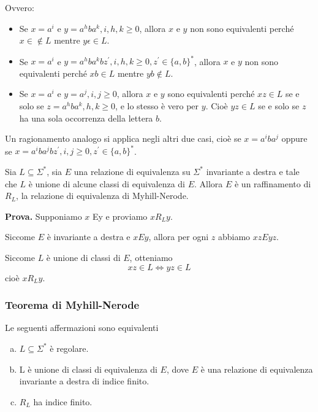 Ovvero:

\begin{itemize}
    \item Se $x=a^{i}$ e $y=a^{h} b a^{k}, i, h, k \geq 0$, allora $x$ e $y$ non sono equivalenti perché $x \in \notin L$ mentre $y \epsilon \in L$.
    \item Se $x=a^{i}$ e $y=a^{h} b a^{k} b z^{\prime}, i, h, k \geq 0, z^{\prime} \in\{a, b\}^{*}$, allora $x$ e $y$ non sono equivalenti perché $x b \in L$ mentre $y b \notin L$.
    \item Se $x=a^{i}$ e $y=a^{j}, i, j \geq 0$, allora $x$ e $y$ sono equivalenti perché $x z \in L$ se e solo se $z=a^{h} b a^{k}, h, k \geq 0$, e lo stesso è vero per $y$. Cioè $y z \in L$ se e solo se $z$ ha una sola occorrenza della lettera $b$.
\end{itemize}

Un ragionamento analogo si applica negli altri due casi, cioè se $x=a^{i} b a^{j}$ oppure se $x=a^{i} b a^{j} b z^{\prime}, i, j \geq 0, z^{\prime} \in\{a, b\}^{*}$.

\vspace{5mm}

Sia $L \subseteq \Sigma^{*}$, sia $E$ una relazione di equivalenza su $\Sigma^{*}$ invariante a destra e tale che $L$ è unione di alcune classi di equivalenza di $E$. Allora $E$ è un raffinamento di $R_{L}$, la relazione di equivalenza di Myhill-Nerode.

\vspace{5mm}

\textbf{Prova. }Supponiamo $x$ Ey e proviamo $x R_{L} y$.

Siccome $E$ è invariante a destra e $x E y$, allora per ogni $z$ abbiamo $x z E y z$.

Siccome $L$ è unione di classi di $E$, otteniamo
$$
x z \in L \Leftrightarrow y z \in L
$$
cioè $x R_{L} y$.

\subsubsection{Teorema di Myhill-Nerode}

Le seguenti affermazioni sono equivalenti

\begin{enumerate}[(a)]
 \item $L \subseteq \Sigma^{*}$ è regolare.
 \item L è unione di classi di equivalenza di $E$, dove $E$ è una relazione di equivalenza invariante a destra di indice finito.
 \item $R_{L}$ ha indice finito.
 \end{enumerate}
 

